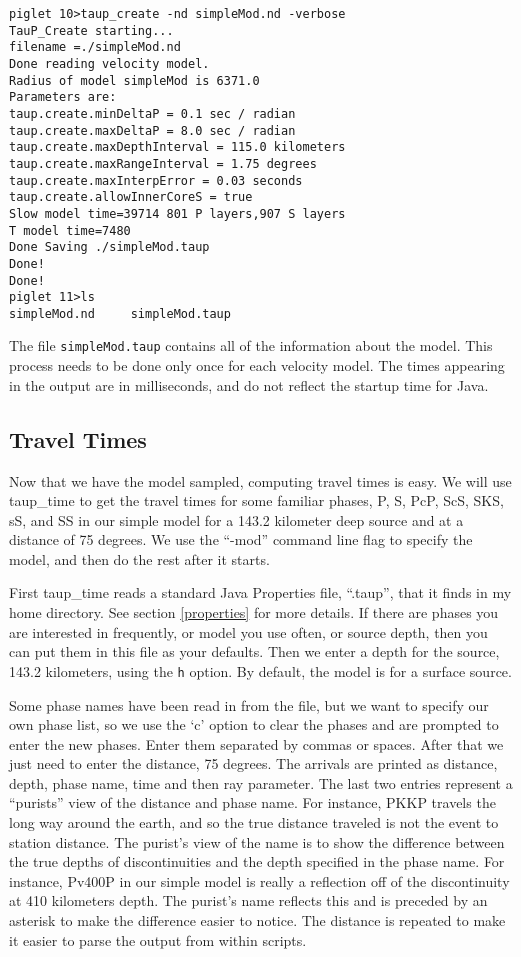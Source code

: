 \begin{verbatim}
piglet 10>taup_create -nd simpleMod.nd -verbose
TauP_Create starting...
filename =./simpleMod.nd
Done reading velocity model.
Radius of model simpleMod is 6371.0
Parameters are:
taup.create.minDeltaP = 0.1 sec / radian
taup.create.maxDeltaP = 8.0 sec / radian
taup.create.maxDepthInterval = 115.0 kilometers
taup.create.maxRangeInterval = 1.75 degrees
taup.create.maxInterpError = 0.03 seconds
taup.create.allowInnerCoreS = true
Slow model time=39714 801 P layers,907 S layers
T model time=7480
Done Saving ./simpleMod.taup
Done!
Done!
piglet 11>ls
simpleMod.nd     simpleMod.taup
\end{verbatim}

The file \texttt{simpleMod.taup} contains all of the information about the
model. This process needs to be done only once for each velocity model.
The times appearing in the output are in milliseconds, and do not reflect the
startup time for Java.

\subsection{Travel Times}

Now that we have the model sampled, computing travel times is easy.
We will use taup\_time to get the travel times for some familiar phases, 
P, S, PcP, ScS, SKS, sS, and SS 
in our simple model for a 143.2 kilometer deep 
source and at a distance of 75 degrees. We use the ``-mod'' command line
flag to specify the model, and then do the rest after it starts.

First taup\_time reads a standard Java Properties file, ``.taup'', 
that it finds in my home directory. See section \ref{properties} for 
more details.
If there are phases you are interested in frequently, or model you use often,
or source depth, then you can put them in this file as your defaults.
Then we enter a depth for the source, 143.2 kilometers, using the \texttt{h}
option. By default, the model is for a surface source.

Some phase names have been read in from the file, but
we want to specify our own phase list, so we use the `c' option
to clear the phases and are prompted to enter the new phases. Enter them 
separated by commas or spaces. After that we just need to enter the distance,
75 degrees. The arrivals are printed as distance, depth, phase name, time and then
ray parameter. 
The last two entries represent a ``purists'' view of the distance and phase name. For instance, PKKP travels the long way around the earth, and so the 
true distance traveled is not the event to station distance. The purist's 
view of the name is to show the difference between the true depths of discontinuities and the depth specified in the phase name. For instance, 
Pv400P in our simple model is really a reflection off of the discontinuity 
at 410 kilometers depth. The purist's name reflects this and is preceded 
by an asterisk to make the difference easier to notice. 
The distance is repeated to make it easier to parse the output
from within scripts.

